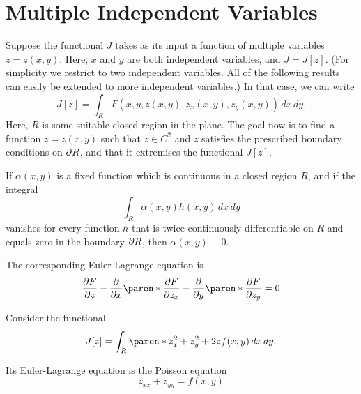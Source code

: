 \documentclass[11pt]{penrose}
\begin{document}
\section{Multiple Independent Variables}
Suppose the functional $J$ takes as its input a function of multiple variables $z = z(x,y)$. Here, $x$ and $y$ are both independent variables, and $J = J[z]$. (For simplicity we restrict to two independent variables. All of the following results can easily be extended to more independent variables.) In that case, we can write
\begin{equation}
    J[z] = \int_{R} F(x, y, z(x,y), z_x (x,y), z_y (x,y)) \,dx\,dy.
\end{equation}
Here, $R$ is some suitable closed region in the plane. The goal now is to find a function $z = z(x,y)$ such that $z \in C^2$ and $z$ satisfies the prescribed boundary conditions on $\partial R$, and that it extremises the functional $J[z]$.

\begin{nlemma}
    If $\alpha(x,y)$ is a fixed function which is continuous in a closed region $R$, and if the integral
    \begin{equation}
        \int_{R} \alpha(x,y) h(x,y) \,dx\,dy
    \end{equation}
    vanishes for every function $h$ that is twice continuously differentiable on $R$ and equals zero in the boundary $\partial R$, then $\alpha(x,y) \equiv 0$.
\end{nlemma}

The corresponding Euler-Lagrange equation is
\begin{equation}
    \frac{\pd F}{\pd z}
    - \frac{\pd}{\pd x} \paren*{\frac{\pd F}{\pd z_x}}
    - \frac{\pd}{\pd y} \paren*{\frac{\pd F}{\pd z_y}}
    = 0
\end{equation}


\begin{negg}
    Consider the functional
    \begin{equation}
        J[z] = \int_{R} \paren*{z_{x}^{2} + z_{y}^{2} + 2zf(x,y)} \,dx\,dy.
    \end{equation}

    Its Euler-Lagrange equation is the Poisson equation
    \begin{equation}
        z_{xx} + z_{yy} = f(x,y)
    \end{equation}
\end{negg}
\end{document}
